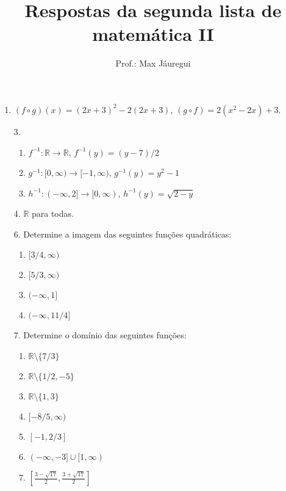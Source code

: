 \documentclass[12pt,a4paper]{article}
\title{Respostas da segunda lista de matemática II}
\author{Prof.: Max Jáuregui}
\date{}
\newcommand{\dsqr}[1]{\left[#1\right]}
\newcommand{\ds}{\displaystyle}
\newcommand{\R}{\mathbb{R}}
\begin{document}
\maketitle

\begin{enumerate}
  \item $(f\circ g)(x)=(2x+3)^2-2(2x+3)$, $(g\circ f)=2(x^2-2x)+3$.
  \item[3.]
  \begin{enumerate}
    \item $f^{-1}:\R\to\R$, $f^{-1}(y)=(y-7)/2$
    \item $g^{-1}:[0,\infty)\to [-1,\infty)$, $g^{-1}(y)=y^2-1$
    \item $h^{-1}:(-\infty,2]\to [0,\infty)$, $h^{-1}(y)=\sqrt{2-y}$
  \end{enumerate}
  \item[4.] $\R$ para todas.
  \item[6.] Determine a imagem das seguintes funções quadráticas:
  \begin{enumerate}
    \item $[3/4,\infty)$
    \item $[5/3,\infty)$
    \item $(-\infty,1]$
    \item $(-\infty,11/4]$
  \end{enumerate}
  \item[7.] Determine o domínio das seguintes funções:
  \begin{enumerate}
    \item $\R\setminus \{7/3\}$
    \item $\R\setminus \{1/2,-5\}$
    \item $\R\setminus\{1,3\}$
    \item $[-8/5,\infty)$
    \item $[-1,2/3]$
    \item $(-\infty,-3]\cup[1,\infty)$
    \item $\ds\dsqr{\frac{3-\sqrt{17}}{2},\frac{3+\sqrt{17}}{2}}$
  \end{enumerate}
\end{enumerate}
\end{document}
